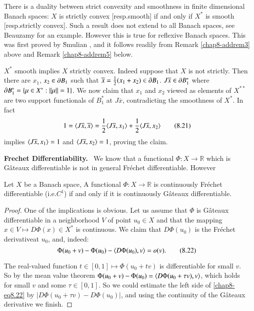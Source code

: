 \begin{remark}\label{chap8-addrem4}
There is a duality between strict convexity and smoothness in finite
dimensional Banach spaces: $X$ is strictly convex [resp.\@ smooth] if
and only if $X^{*}$ is smooth [resp.\@ strictly convex]. Such a result
does not extend to all Banach spaces, see Beauzamy \cite[p. 186]{key8}
for an example. However this is true for reflexive Banach spaces. This
was first proved by \u{S}mulian \cite{key75}, and it follows readily
from Remark \ref{chap8-addrem3} above and Remark \ref{chap8-addrem5}
below. 
\end{remark}

\begin{remark}\label{chap8-addrem5}
$X^{*}$ smooth implies $X$ strictly convex. Indeed suppose that $X$ is
  not strictly. Then there are $x_{1}$, $x_{2}\in \partial B_{1}$ such that
  $\overline{x}=\frac{1}{2}(x_{1}+x_{2})\in \partial
  B_{1}$. $J\overline{x}\in \partial B^{*}_{1}$ where $\partial B^{*}_{1}=\{\mu\in
  X^{*}:||\mu||=1\}$. We now claim that $x_{1}$ and $x_{2}$ viewed as
  elements of $X^{**}$ are two support functionals of $B^{*}_{1}$ at
  $J\overline{x}$, contradicting the smoothness of $X^{*}$. In fact
\begin{equation*}
1=\langle J\overline{x},\overline{x}\rangle=\frac{1}{2}\langle
J\overline{x},x_{1}\rangle+\frac{1}{2}\langle
J\overline{x},x_{2}\rangle\tag{8.21}\label{chap8-eq8.21} 
\end{equation*}
implies $\langle J\overline{x},x_{1}\rangle=1$ and $\langle
J\overline{x},x_{2}\rangle=1$, proving the claim.
\end{remark}

\noindent
{\bf Frechet Differentiability.}~ We know that a functional $\Phi:X\to
\mathbb{R}$ which is G\^ateaux differentiable is not in general
Fr\'echet differentiable. However

\begin{proposition}\label{chap8-prop8.6}
Let $X$ be a Banach space, A functional $\Phi:X\to \mathbb{R}$ is
continuously Fr\'echet differentiable (i.e.\@ $C^{1}$) if and only if
it is continuously G\^ateaux differentiable.
\end{proposition}

\begin{proof}
One of the implications is obvious. Let us assume that $\Phi$ is
G\^ateaux differentiable in a neighborhood $V$ of point $u_{0}\in X$
and that the mapping $x\in V\mapsto D\Phi(x)\in X^{*}$ is
continuous. We claim that $D\Phi(u_{0})$ is the Fr\'echet
derivative\pageoriginale at $u_{0}$, and, indeed:
\begin{equation*}
\Phi(u_{0}+v)-\Phi(u_{0})-\langle
D\Phi(u_{0}),v\rangle=o(v).\tag{8.22}\label{chap8-eq8.22} 
\end{equation*}

The real-valued function $t\in [0,1]\mapsto \Phi(u_{0}+tv)$ is
differentiable for small $v$. So by the mean value theorem
$\Phi(u_{0}+v)-\Phi(u_{0})=\langle D\Phi(u_{0}+\tau v),v\rangle$, which holds
for small $v$ and some $\tau\in [0,1]$. So we could estimate the left
side of \eqref{chap8-eq8.22} by $|D\Phi(u_{0}+\tau v)-D\Phi(u_{0})|$,
and using the continuity of the G\^ateaux derivative we finish.
\end{proof}

